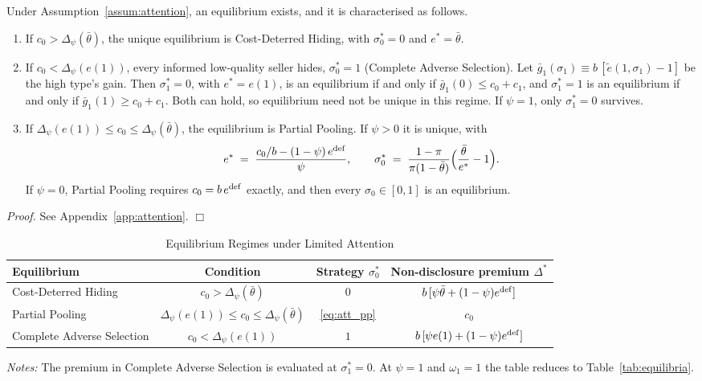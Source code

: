 \begin{proposition}
\label{prop:att_equilibrium}
Under Assumption~\ref{assum:attention}, an equilibrium exists, and it is characterised as follows.
\begin{enumerate}[label=(\roman*)]
    \item If $c_0>\Delta_\psi(\bar\theta)$, the unique equilibrium is Cost-Deterred Hiding, with $\sigma_0^*=0$ and $e^*=\bar\theta$.
    \item If $c_0<\Delta_\psi(e(1))$, every informed low-quality seller hides, $\sigma_0^*=1$ (Complete Adverse Selection). Let $\bar g_1(\sigma_1)\equiv b\,[\tilde e(1,\sigma_1)-1]$ be the high type's gain. Then $\sigma_1^*=0$, with $e^*=e(1)$, is an equilibrium if and only if $\bar g_1(0)\le c_0+c_1$, and $\sigma_1^*=1$ is an equilibrium if and only if $\bar g_1(1)\ge c_0+c_1$. Both can hold, so equilibrium need not be unique in this regime. If $\psi=1$, only $\sigma_1^*=0$ survives.
    \item If $\Delta_\psi(e(1))\le c_0\le\Delta_\psi(\bar\theta)$, the equilibrium is Partial Pooling. If $\psi>0$ it is unique, with
    \begin{equation}
        e^*\;=\;\frac{c_0/b-(1-\psi)\,e^{\rm def}}{\psi},\qquad \sigma_0^*\;=\;\frac{1-\pi}{\pi(1-\bar\theta)}\Big(\frac{\bar\theta}{e^*}-1\Big).
        \label{eq:att_pp}
    \end{equation}
    If $\psi=0$, Partial Pooling requires $c_0=b\,e^{\rm def}$ exactly, and then every $\sigma_0\in[0,1]$ is an equilibrium.
\end{enumerate}
\end{proposition}

\noindent\textit{Proof.} See Appendix~\ref{app:attention}. $\Box$

\begin{table}[htbp]
\centering
\caption{Equilibrium Regimes under Limited Attention}
\label{tab:att_equilibria}
\small\renewcommand{\arraystretch}{1.5}
\begin{tabular*}{\textwidth}{@{\extracolsep{\fill}}lccc@{}}
\toprule\toprule
\textbf{Equilibrium} & \textbf{Condition} & \textbf{Strategy $\sigma_0^*$} & \textbf{Non-disclosure premium $\Delta^*$} \\
\midrule
Cost-Deterred Hiding & $c_0>\Delta_\psi(\bar\theta)$ & $0$ & $b\,[\psi\bar\theta+(1-\psi)e^{\rm def}]$ \\
Partial Pooling & $\Delta_\psi(e(1))\le c_0\le\Delta_\psi(\bar\theta)$ & \eqref{eq:att_pp} & $c_0$ \\
Complete Adverse Selection & $c_0<\Delta_\psi(e(1))$ & $1$ & $b\,[\psi e(1)+(1-\psi)e^{\rm def}]$ \\
\bottomrule\bottomrule
\end{tabular*}

\vspace{0.5em}
\raggedright
\footnotesize
\textit{Notes:} The premium in Complete Adverse Selection is evaluated at $\sigma_1^*=0$. At $\psi=1$ and $\omega_1=1$ the table reduces to Table~\ref{tab:equilibria}.
\end{table}

